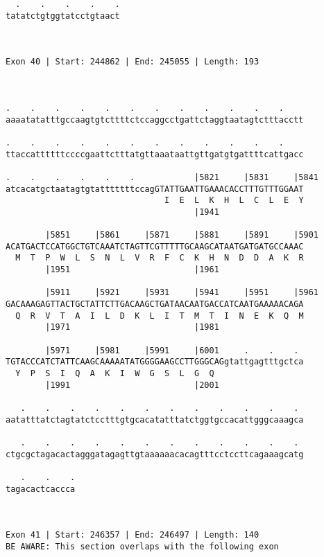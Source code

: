 \documentclass{article}
\begin{document}
\begin{Verbatim}
  .    .    .    .    .
tatatctgtggtatcctgtaact
                       
                       
 
Exon 40 | Start: 244862 | End: 245055 | Length: 193



.    .    .    .    .    .    .    .    .    .    .    .    
aaaatatatttgccaagtgtcttttctccaggcctgattctaggtaatagtctttacctt
                                                            
.    .    .    .    .    .    .    .    .    .    .    .    
ttaccattttttccccgaattctttatgttaaataattgttgatgtgattttcattgacc
                                                            
.    .    .    .    .    .            |5821     |5831     |5841
atcacatgctaatagtgtatttttttccagGTATTGAATTGAAACACCTTTGTTTGGAAT
                                I  E  L  K  H  L  C  L  E  Y
                                      |1941                 
  
        |5851     |5861     |5871     |5881     |5891     |5901
ACATGACTCCATGGCTGTCAAATCTAGTTCGTTTTTGCAAGCATAATGATGATGCCAAAC
  M  T  P  W  L  S  N  L  V  R  F  C  K  H  N  D  D  A  K  R
        |1951                         |1961                 
  
        |5911     |5921     |5931     |5941     |5951     |5961
GACAAAGAGTTACTGCTATTCTTGACAAGCTGATAACAATGACCATCAATGAAAAACAGA
  Q  R  V  T  A  I  L  D  K  L  I  T  M  T  I  N  E  K  Q  M
        |1971                         |1981                 
  
        |5971     |5981     |5991     |6001     .    .    . 
TGTACCCATCTATTCAAGCAAAAATATGGGGAAGCCTTGGGCAGgtattgagtttgctca
  Y  P  S  I  Q  A  K  I  W  G  S  L  G  Q                  
        |1991                         |2001                 
  
   .    .    .    .    .    .    .    .    .    .    .    . 
aatatttatctagtatctcctttgtgcacatatttatctggtgccacattgggcaaagca
                                                            
   .    .    .    .    .    .    .    .    .    .    .    . 
ctgcgctagacactagggatagagttgtaaaaaacacagtttcctccttcagaaagcatg
                                                            
   .    .    .
tagacactcaccca
              
              
 
Exon 41 | Start: 246357 | End: 246497 | Length: 140
BE AWARE: This section overlaps with the following exon




\end{Verbatim}
\end{document}
